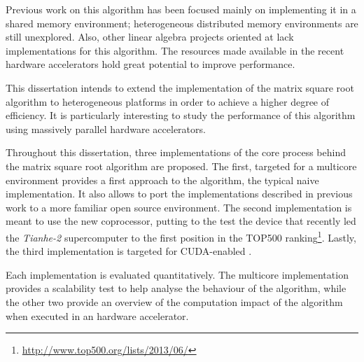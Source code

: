 \documentclass[../thesis]{subfiles}
\begin{document}
	Previous work on this algorithm has been focused mainly on implementing it in a \cpu shared memory environment; heterogeneous distributed memory environments are still unexplored. Also, other linear algebra projects oriented at \gpus lack implementations for this algorithm. The resources made available in the recent hardware accelerators hold great potential to improve performance.

	This dissertation intends to extend the implementation of the matrix square root algorithm to heterogeneous platforms in order to achieve a higher degree of efficiency. It is particularly interesting to study the performance of this algorithm using massively parallel hardware accelerators.

	Throughout this dissertation, three implementations of the core process behind the matrix square root algorithm are proposed. The first, targeted for a multicore environment provides a first approach to the algorithm, the typical naive implementation. It also allows to port the implementations described in previous work to a more familiar open source environment. The second implementation is meant to use the new \intel\xeonphi coprocessor, putting to the test the device that recently led the \textit{Tianhe-2} supercomputer to the first position in the TOP500 ranking\footnote{\url{http://www.top500.org/lists/2013/06/}}. Lastly, the third implementation is targeted for CUDA-enabled \gpus.

	Each implementation is evaluated quantitatively. The multicore implementation provides a scalability test to help analyse the behaviour of the algorithm, while the other two provide an overview of the computation impact of the algorithm when executed in an hardware accelerator.

\end{document}
